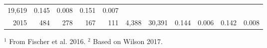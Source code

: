 \documentclass[]{article}
\begin{document}
\begin{longtable}[]{@{}rrrrrrrrrrr@{}}
\begin{minipage}[t]{0.05\columnwidth}
19,619\strut
\end{minipage} & \begin{minipage}[t]{0.09\columnwidth}\raggedleft\strut
0.145\strut
\end{minipage} & \begin{minipage}[t]{0.05\columnwidth}\raggedleft\strut
0.008\strut
\end{minipage} & \begin{minipage}[t]{0.10\columnwidth}\raggedleft\strut
0.151\strut
\end{minipage} & \begin{minipage}[t]{0.04\columnwidth}\raggedleft\strut
0.007\strut
\end{minipage}\tabularnewline
\begin{minipage}[t]{0.06\columnwidth}\raggedleft\strut
2015\strut
\end{minipage} & \begin{minipage}[t]{0.07\columnwidth}\raggedleft\strut
484\strut
\end{minipage} & \begin{minipage}[t]{0.07\columnwidth}\raggedleft\strut
278\strut
\end{minipage} & \begin{minipage}[t]{0.07\columnwidth}\raggedleft\strut
167\strut
\end{minipage} & \begin{minipage}[t]{0.07\columnwidth}\raggedleft\strut
111\strut
\end{minipage} & \begin{minipage}[t]{0.07\columnwidth}\raggedleft\strut
4,388\strut
\end{minipage} & \begin{minipage}[t]{0.05\columnwidth}\raggedleft\strut
30,391\strut
\end{minipage} & \begin{minipage}[t]{0.09\columnwidth}\raggedleft\strut
0.144\strut
\end{minipage} & \begin{minipage}[t]{0.05\columnwidth}\raggedleft\strut
0.006\strut
\end{minipage} & \begin{minipage}[t]{0.10\columnwidth}\raggedleft\strut
0.142\strut
\end{minipage} & \begin{minipage}[t]{0.04\columnwidth}\raggedleft\strut
0.008\strut
\end{minipage}\tabularnewline
\bottomrule
\end{longtable}
$^1$ From Fischer et al. 2016.
\newline
$^2$ Based on Wilson 2017.
\end{document}
